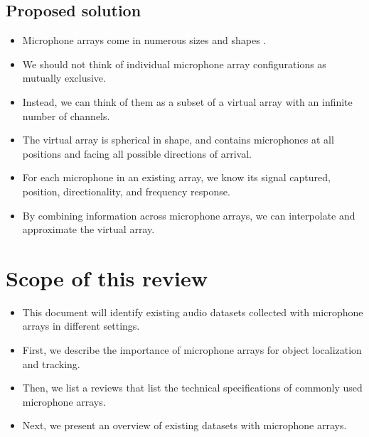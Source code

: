 \documentclass[14pt, legalpaper]{extarticle}
\begin{document}
\subsection{Proposed solution}

\begin{itemize}

\item Microphone arrays come in numerous sizes and shapes \cite{kurz2015comparison, bates2017comparing, lopez2019sphear}. 

\item We should not think of individual microphone array configurations as mutually exclusive.

\item Instead, we can think of them as a subset of a virtual array with an infinite number of channels.

\item The virtual array is spherical in shape, and contains microphones at all positions and facing all possible directions of arrival.

\item For each microphone in an existing array, we know its signal captured, position, directionality, and frequency response. 

\item By combining information across microphone arrays, we can interpolate and approximate the virtual array.

\end{itemize}

\section{Scope of this review}

\begin{itemize}

\item This document will identify existing audio datasets collected with microphone arrays in different settings.

\item First, we describe the importance of microphone arrays for object localization and tracking.

\item Then, we list a reviews that list the technical specifications of commonly used microphone arrays.

\item Next, we present an overview of existing datasets with microphone arrays.

\end{itemize}
\end{document}
